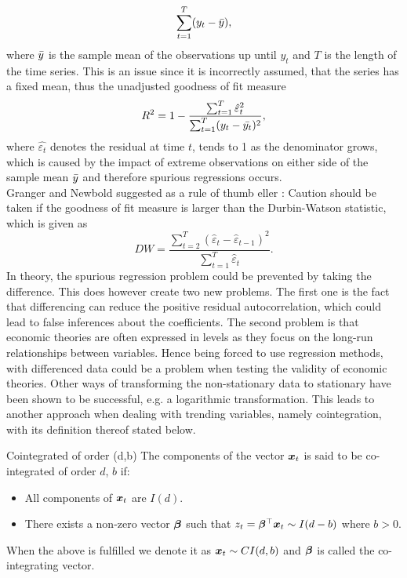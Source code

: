 \begin{equation*}
    \sum_{t=1}^T(y_t-\Bar{y}),
\end{equation*}
where $\Bar{y}$ is the sample mean of the observations up until $y_t$ and $T$ is the length of the time series. This is an issue since it is incorrectly assumed, that the series has a fixed mean, thus the unadjusted goodness of fit measure 
\begin{equation*}
    R^2=1-\frac{\sum_{t=1}^T\hat{\varepsilon}^2_t}{\sum_{t=1}^T(y_t-\Bar{y_t})^2},
\end{equation*}
where $\hat{\varepsilon_t}$ denotes the residual at time $t$, tends to 1 as the denominator grows, which is caused by the impact of extreme observations on either side of the sample mean $\Bar{y}$ and therefore spurious regressions occurs. \bigskip \\
\noindent Granger and Newbold suggested as a rule of thumb \cite{Analysis_of_integrated_and_cointegrated_time_series_with_R} eller \cite{Spurious_Regressions_in_Econonmetrics_1974}: Caution should be taken if the goodness of fit measure is larger than the Durbin-Watson statistic, which is given as
\begin{equation*}
    DW=\frac{\sum_{t=2}^T(\hat{\varepsilon}_t-\hat{\varepsilon}_{t-1})^2}{\sum_{t=1}^T\hat{\varepsilon}_t}.
\end{equation*}
In theory, the spurious regression problem could be prevented by taking the difference. This does however create two new problems. The first one is the fact that differencing can reduce the positive residual autocorrelation, which could lead to false inferences about the coefficients. The second problem is that economic theories are often expressed in levels as they focus on the long-run relationships between variables. Hence being forced to use regression methods, with differenced data could be a problem when testing the validity of economic theories. Other ways of transforming the non-stationary data to stationary have been shown to be successful, e.g. a logarithmic transformation.
This leads to another approach when dealing with trending variables, namely cointegration, with its definition thereof stated below.

\begin{defi}{Cointegrated of order (d,b)}
    The components of the vector $\boldsymbol{x}_t$ is said to be co-integrated of order $d$, $b$ if:
    \begin{itemize}
        \item All components of $\boldsymbol{x}_t$ are $I(d)$.
        \item There exists a non-zero vector $\boldsymbol{\beta}$ such that $z_t=\boldsymbol{\beta}^\top \boldsymbol{x}_t\sim I(d-b)$ where $b>0$.
    \end{itemize}
    When the above is fulfilled we denote it as $\boldsymbol{x}_t\sim CI(d,b)$ and $\boldsymbol{\beta}$ is called the co-integrating vector.
    \label{Def:Co-integrated of order d,b}
\end{defi}
 

